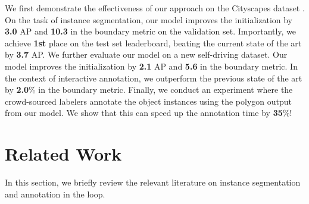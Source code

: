 \documentclass[10pt,twocolumn,letterpaper]{article}
\begin{document}
We first demonstrate the effectiveness of our approach on the Cityscapes dataset  \cite{cityscapes}.
On the task of instance segmentation, our model improves the initialization by \textbf{3.0} AP and \textbf{10.3} in the boundary metric on the validation set. Importantly, we achieve \textbf{1st} place on the test set leaderboard, beating the current state of the art by \textbf{3.7} AP. We further evaluate our model on a new self-driving dataset. Our model improves the initialization by \textbf{2.1} AP and \textbf{5.6} in the boundary metric.  In the context of interactive annotation, we outperform the previous state of the art \cite{wang2019delse} by \textbf{2.0}\% in the boundary metric. 
Finally, we conduct an experiment where the crowd-sourced labelers annotate the object instances using the polygon output from our model. We show that this can speed up the annotation time by \textbf{35}\%! 
% 

\section{Related Work}
In this section, we briefly review the relevant literature on instance segmentation and annotation in the loop. 
\end{document}
